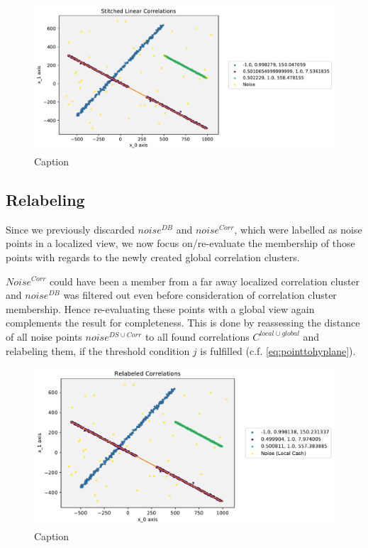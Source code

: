 \begin{figure}
    \centering
    \includegraphics[width=.6\textwidth]{figures_method/StitchedLinearCorrelationsWithCorrs.pdf}
    \caption{Caption}
    \label{fig:my_label}
\end{figure}

\subsection{Relabeling}

Since we previously discarded $noise^{DB}$ and $noise^{Corr}$, which were labelled as noise points in a localized view, we now focus on/re-evaluate the membership of those points with regards to the newly created global correlation clusters. 

$Noise^{Corr}$ could have been a member from a far away localized correlation cluster and $noise^{DB}$ was filtered out even before consideration of correlation cluster membership. Hence re-evaluating these points with a global view again complements the result for completeness. This is done by reassessing the distance of all noise points $noise^{DS \cup Corr}$ to all found correlations $C^{local \cup global}$ and relabeling them, if the threshold condition $j$ is fulfilled (c.f. \autoref{eq:pointtohyplane}).\\
\begin{figure}
    \centering
    \includegraphics[width=.6\textwidth]{figures_method/RelabeledCorrelationsWithCorrsL.pdf}
    \caption{Caption}
    \label{fig:my_label}
\end{figure}

